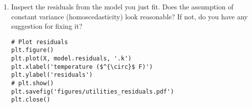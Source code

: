 \documentclass[10pt]{article}
\begin{document}
\begin{enumerate}[label=(\Alph*)]
        \begin{lstlisting}
from __future__ import division
import numpy as np 
import matplotlib.pyplot as plt
import sys
sys.path.append('../../scripts/')
from smoothers import kernel_smoother
import pandas as pd
        \end{lstlisting}

        \begin{lstlisting}
# Import data
data = pd.read_csv('../../data/utilities.csv', delimiter=',')

# Parse data
X = data['temp']
Y = np.log(data['gasbill']/data['billingdays'])

# Sort X data for plotting purposes
x_star = X.drop_duplicates().sort_values().values

# Instantiate smoother object (Default is a Gaussian kernel, order one)
model = kernel_smoother(X, Y, X, h=2)
# Run smoother on the data 
model.local_general()
# Optimize the bandwidth using LOOCV
h = model.LOOCV_optimization()
        \end{lstlisting}

        \begin{lstlisting}
# Instantiate second model with sorted x-data
optimal = kernel_smoother(X, Y, x_star, h=h)
# Run model
optimal.local_general()

# Plot fit
plt.figure()
plt.plot(X, Y, '.k')
plt.plot(x_star, optimal.y_star, '-b')
plt.xlabel('temperature ($^{\circ}$ F)')
plt.ylabel('normalized gassbill')
# plt.show()
plt.savefig('figures/utilities_fit.pdf')
plt.close()
        \end{lstlisting}

        \begin{figure}[ht] 
          \centering 
          \texttt{[image: figures/utilities\_fit.pdf]}
          \caption{\label{fig:utilities_fit} Fit using LOOCV, $h=6.87$}
        \end{figure}

        \item Inspect the residuals from the model you just fit.  Does the assumption of constant variance (homoscedasticity) look reasonable?  If not, do you have any suggestion for fixing it?

        \begin{lstlisting}
# Plot residuals
plt.figure()
plt.plot(X, model.residuals, '.k')
plt.xlabel('temperature ($^{\circ}$ F)')
plt.ylabel('residuals')
# plt.show()
plt.savefig('figures/utilities_residuals.pdf')
plt.close()


\end{lstlisting}
\end{enumerate}
\end{document}
